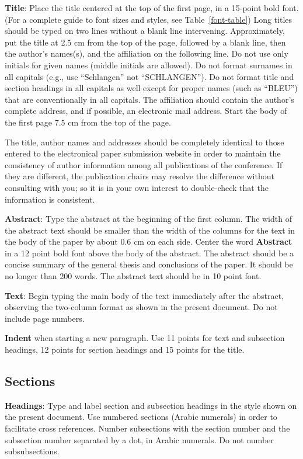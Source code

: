\documentclass[11pt]{article}
\begin{document}
{\bf Title}: Place the title centered at the top of the first page, in
a 15-point bold font. (For a complete guide to font sizes and styles,
see Table~\ref{font-table}) Long titles should be typed on two lines
without a blank line intervening. Approximately, put the title at 2.5
cm from the top of the page, followed by a blank line, then the
author's names(s), and the affiliation on the following line. Do not
use only initials for given names (middle initials are allowed). Do
not format surnames in all capitals (e.g., use ``Schlangen'' not
``SCHLANGEN'').  Do not format title and section headings in all
capitals as well except for proper names (such as ``BLEU'') that are
conventionally in all capitals.  The affiliation should contain the
author's complete address, and if possible, an electronic mail
address. Start the body of the first page 7.5 cm from the top of the
page.

The title, author names and addresses should be completely identical
to those entered to the electronical paper submission website in order
to maintain the consistency of author information among all
publications of the conference. If they are different, the publication
chairs may resolve the difference without consulting with you; so it
is in your own interest to double-check that the information is
consistent.

{\bf Abstract}: Type the abstract at the beginning of the first
column. The width of the abstract text should be smaller than the
width of the columns for the text in the body of the paper by about
0.6 cm on each side. Center the word {\bf Abstract} in a 12 point bold
font above the body of the abstract. The abstract should be a concise
summary of the general thesis and conclusions of the paper. It should
be no longer than 200 words. The abstract text should be in 10 point font.

{\bf Text}: Begin typing the main body of the text immediately after
the abstract, observing the two-column format as shown in 
the present document. Do not include page numbers.

{\bf Indent} when starting a new paragraph. Use 11 points for text and 
subsection headings, 12 points for section headings and 15 points for
the title. 

\subsection{Sections}

{\bf Headings}: Type and label section and subsection headings in the
style shown on the present document.  Use numbered sections (Arabic
numerals) in order to facilitate cross references. Number subsections
with the section number and the subsection number separated by a dot,
in Arabic numerals. Do not number subsubsections.
\end{document}
